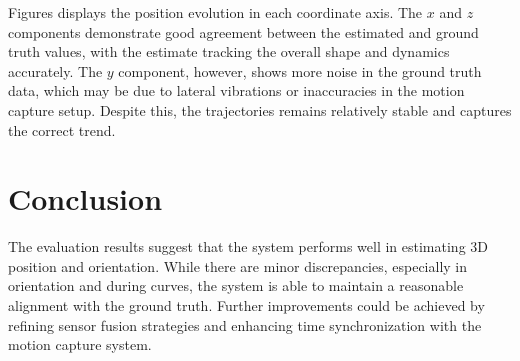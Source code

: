 \documentclass[11pt]{article}
\begin{document}
\FloatBarrier %

Figures displays the position evolution in each coordinate axis. The $x$ and $z$ components demonstrate good agreement between the estimated and ground truth values, with the estimate tracking the overall shape and dynamics accurately. The $y$ component, however, shows more noise in the ground truth data, which may be due to lateral vibrations or inaccuracies in the motion capture setup. Despite this, the  trajectories remains relatively stable and captures the correct trend.

\section{Conclusion}

The evaluation results suggest that the system performs well in estimating 3D position and orientation. While there are minor discrepancies, especially in orientation and during curves, the system is able to maintain a reasonable alignment with the ground truth. Further improvements could be achieved by refining sensor fusion strategies and enhancing time synchronization with the motion capture system.
\end{document}
